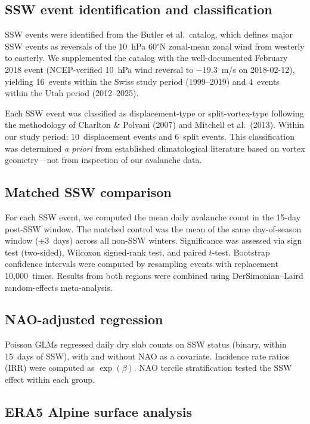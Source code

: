 \documentclass[11pt,letterpaper]{article}
\begin{document}
\subsection{SSW event identification and classification}

SSW events were identified from the Butler et al.\ catalog, which defines major SSW events as reversals of the 10~hPa 60$^\circ$N zonal-mean zonal wind from westerly to easterly. We supplemented the catalog with the well-documented February 2018 event (NCEP-verified 10~hPa wind reversal to $-19.3$~m/s on 2018-02-12), yielding 16~events within the Swiss study period (1999--2019) and 4~events within the Utah period (2012--2025).

Each SSW event was classified as displacement-type or split-vortex-type following the methodology of Charlton \& Polvani (2007) and Mitchell et al.\ (2013). Within our study period: 10~displacement events and 6~split events. This classification was determined \textit{a priori} from established climatological literature based on vortex geometry---not from inspection of our avalanche data.

\subsection{Matched SSW comparison}

For each SSW event, we computed the mean daily avalanche count in the 15-day post-SSW window. The matched control was the mean of the same day-of-season window ($\pm 3$~days) across all non-SSW winters. Significance was assessed via sign test (two-sided), Wilcoxon signed-rank test, and paired $t$-test. Bootstrap confidence intervals were computed by resampling events with replacement 10,000~times. Results from both regions were combined using DerSimonian--Laird random-effects meta-analysis.

\subsection{NAO-adjusted regression}

Poisson GLMs regressed daily dry slab counts on SSW status (binary, within 15~days of SSW), with and without NAO as a covariate. Incidence rate ratios (IRR) were computed as $\exp(\beta)$. NAO tercile stratification tested the SSW effect within each group.

\subsection{ERA5 Alpine surface analysis}
\end{document}
